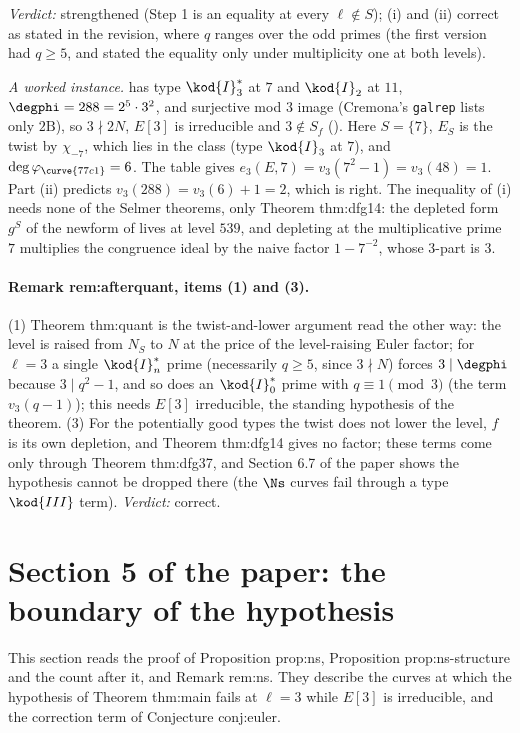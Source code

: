 \begin{sloppypar}
\noindent\emph{Verdict:} strengthened (Step 1 is an equality at every $\ell\notin S$); (i) and (ii) correct as stated in the revision, where $q$ ranges over the odd primes (the first
version had $q\ge5$, and stated the equality only under multiplicity one at both levels).

\emph{A worked instance.}  has type $\kod{I}_3^*$ at $7$ and $\kod{I}_2$ at $11$, $\degphi=288=2^5\cdot3^2$, and surjective mod $3$ image (Cremona's \texttt{galrep} lists only $2\mathrm B$),
so $3\nmid2N$, $E[3]$ is irreducible and $3\notin S_f$ (). Here $S=\{7\}$, $E_S$ is the twist by $\chi_{-7}$, which lies in the class  (type $\kod{I}_3$ at $7$), and
$\deg\varphi_{\curve{77c1}}=6$. The table gives $e_3(E,7)=v_3(7^2-1)=v_3(48)=1$. Part (ii) predicts $v_3(288)=v_3(6)+1=2$, which is right. The inequality of (i) needs none of the Selmer
theorems, only Theorem thm:dfg14: the depleted form $g^S$ of the newform of  lives at level $539$, and depleting at the multiplicative prime $7$ multiplies the congruence ideal by
the naive factor $1-7^{-2}$, whose $3$-part is $3$.

\paragraph{Remark rem:afterquant, items (1) and (3).} (1) Theorem thm:quant is the twist-and-lower argument read the other way: the level is raised from $N_S$ to $N$ at the price of
the level-raising Euler factor; for $\ell=3$ a single $\kod{I}_n^*$ prime (necessarily $q\ge5$, since $3\nmid N$) forces $3\mid\degphi$ because $3\mid q^2-1$, and so does an $\kod{I}_0^*$ prime with
$q\equiv1\pmod3$ (the term $v_3(q-1)$); this needs $E[3]$ irreducible, the standing hypothesis of the theorem. (3) For the potentially good types the twist does not lower the level, $f$ is
its own depletion, and Theorem thm:dfg14 gives no factor; these terms come only through Theorem thm:dfg37, and Section 6.7 of the paper shows the hypothesis cannot be dropped there
(the $\Ns$ curves fail through a type $\kod{III}$ term). \emph{Verdict:} correct.

\section[Paper 5: the boundary]{Section 5 of the paper: the boundary of the hypothesis}\label{sec:paper:boundary}

This section reads the proof of Proposition prop:ns, Proposition prop:ns-structure and the count after it, and Remark rem:ns. They describe the curves at
which the hypothesis of Theorem thm:main fails at $\ell=3$ while $E[3]$ is irreducible, and the correction term of Conjecture conj:euler.


\end{sloppypar}
